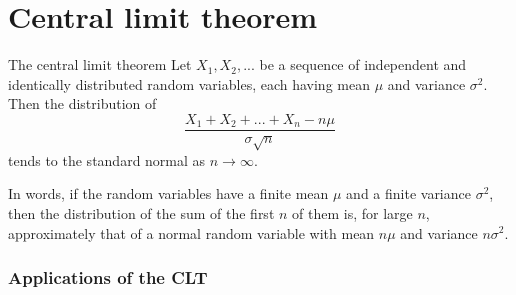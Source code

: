\documentclass[slidestop,compress,mathserif]{beamer}
\begin{document}
\section{Central limit theorem}
\begin{frame}
\begin{block}{The central limit theorem}
Let $X_1, X_2, ...$ be a sequence of independent and identically distributed random variables, each having mean $\mu$ and variance $\sigma^2$. Then the distribution of
$$\frac{X_1 + X_2 + ... + X_n - n\mu}{\sigma \sqrt{n}}$$
tends to the standard normal as $n \to \infty$. 
\end{block}

\vspace{5mm}
In words, if the random variables have a finite mean $\mu$ and a finite variance $\sigma^2$, then the distribution of the sum of the first $n$ of them is, for large $n$, approximately that of a normal random variable with mean $n\mu$ and variance $n\sigma^2$.
\end{frame}



\begin{frame}\frametitle{Applications of the CLT}

\end{frame}
\end{document}
